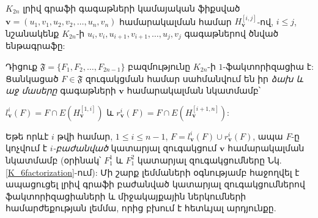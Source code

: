 $K_{2n}$ լրիվ գրաֆի գագաթների կամայական ֆիքսված $\mathbf{v} = \left(u_1,v_1, u_2,v_2, \ldots,u_n,v_n\right)$ համարակալման համար $H_{\mathbf{v}}^{[i,j]}$-ով, $i \leq j$, նշանակենք $K_{2n}$-ի $u_i, v_i, u_{i+1}, v_{i+1}, \ldots, u_j, v_j$ գագաթներով ծնված ենթագրաֆը: 

Դիցուք $\mathfrak{F} = \{F_1, F_2, \ldots, F_{2n-1}\}$ բազմությունը $K_{2n}$-ի $1$-ֆակտորիզացիա է: Ցանկացած $F\in \mathfrak{F}$ զուգակցման համար սահմանվում են իր \textit{ձախ և աջ մասերը} գագաթների $\mathbf{v}$ համարակալման նկատմամբ՝
\begin{center}
$l_{\mathbf{v}}^i(F) = F \cap E\left(H_{\mathbf{v}}^{[1,i]}\right)$ և
$r_{\mathbf{v}}^i(F) = F \cap E\left(H_{\mathbf{v}}^{[i+1,n]}\right)$:
\end{center}
Եթե որևէ $i$ թվի համար, $1 \leq i \leq n-1$, $F = l_{\mathbf{v}}^i(F) \cup r_{\mathbf{v}}^i(F)$, ապա $F$-ը կոչվում է \textit{$i$-բաժանված} կատարյալ զուգակցում $\mathbf{v}$ համարակալման նկատմամբ (օրինակ՝ $F_1^1$ և $F_1^2$ կատարյալ զուգակցումները Նկ. \ref{K_6factorization}-ում): Մի շարք լեմմաների օգնությամբ հաջողվել է ապացուցել լրիվ գրաֆի բաժանված կատարյալ զուգակցումներով ֆակտորիզացիաների և միջակայքային ներկումների համարժեքության լեմմա, որից բխում է հետևյալ արդյունքը.


